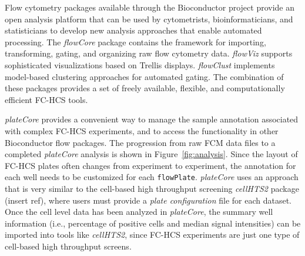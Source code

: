 \documentclass[12pt]{article}
\newcommand{\Rclass}[1]{{\texttt{#1}}}
\newcommand{\Rpackage}[1]{{\textit{#1}}}
\begin{document}
Flow cytometry packages available through the Bioconductor project provide an open analysis platform that
can be used by cytometrists, bioinformaticians, and statisticians to develop new analysis approaches that
enable automated processing. The \Rpackage{flowCore} package contains the framework for importing, transforming, gating, and
organizing raw flow cytometry data. \Rpackage{flowViz} supports sophisticated visualizations based on Trellis displays. 
\Rpackage{flowClust} implements model-based clustering approaches for automated gating. The combination of
these packages provides a set of freely available, flexible, and computationally efficient FC-HCS tools.

\Rpackage{plateCore} provides a convenient way to manage the sample annotation associated with complex FC-HCS experiments, and
to access the functionality in other Bioconductor flow packages. 
The progression from raw FCM data files to a completed \Rpackage{plateCore} analysis is shown in Figure~\ref{fig:analysis}.
Since the layout of FC-HCS plates often changes from experiment
to experiment, the annotation for each well needs to be customized for each
\Rclass{flowPlate}. \Rpackage{plateCore} uses an approach that is very similar to the cell-based high throughput screening \Rpackage{cellHTS2} package (insert ref),
where users must provide a \textit{plate configuration} file for each dataset. Once the cell level data has
been analyzed in \Rpackage{plateCore}, the summary well information (i.e., percentage of positive cells and median
signal intensities) can be imported into tools like \Rpackage{cellHTS2}, since FC-HCS experiments are just one 
type of cell-based high throughput screens.
\end{document}
